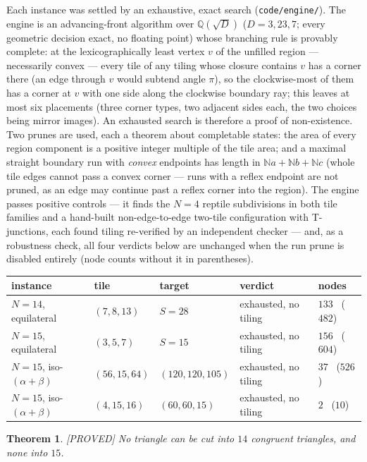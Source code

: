\documentclass[11pt,reqno]{amsart}
\theoremstyle{plain}
\newtheorem{theorem}{Theorem}
\theoremstyle{definition}
\newcommand{\Q}{\mathbb{Q}}
\newcommand{\N}{\mathbb{N}}
\newcommand{\lab}[1]{\hfill\textnormal{\footnotesize\textsc{[#1]}}}
\begin{document}
Each instance was settled by an exhaustive, exact search (\texttt{code/engine/}). The engine is an
advancing-front algorithm over $\Q(\sqrt D)$ ($D=3,23,7$; every geometric decision exact, no
floating point) whose branching rule is provably complete: at the lexicographically least vertex
$v$ of the unfilled region --- necessarily convex --- every tile of any tiling whose closure
contains $v$ has a corner there (an edge through $v$ would subtend angle $\pi$), so the
clockwise-most of them has a corner at $v$ with one side along the clockwise boundary ray; this
leaves at most six placements (three corner types, two adjacent sides each, the two choices being
mirror images). An exhausted search is therefore a proof of non-existence. Two prunes are used,
each a theorem about completable states: the area of every region component is a positive integer
multiple of the tile area; and a maximal straight boundary run with \emph{convex} endpoints has
length in $\N a+\N b+\N c$ (whole tile edges cannot pass a convex corner --- runs with a reflex
endpoint are not pruned, as an edge may continue past a reflex corner into the region). The engine
passes positive controls --- it finds the $N=4$ reptile subdivisions in both tile families and a
hand-built non-edge-to-edge two-tile configuration with T-junctions, each found tiling re-verified
by an independent checker --- and, as a robustness check, all four verdicts below are unchanged
when the run prune is disabled entirely (node counts without it in parentheses).
\begin{center}
\begin{tabular}{lllll}
instance & tile & target & verdict & nodes\\
\hline
$N=14$, equilateral & $(7,8,13)$ & $S=28$ & exhausted, no tiling & $133$ \ ($482$)\\
$N=15$, equilateral & $(3,5,7)$ & $S=15$ & exhausted, no tiling & $156$ \ ($604$)\\
$N=15$, iso-$(\alpha{+}\beta)$ & $(56,15,64)$ & $(120,120,105)$ & exhausted, no tiling & $37$ \ ($526$)\\
$N=15$, iso-$(\alpha{+}\beta)$ & $(4,15,16)$ & $(60,60,15)$ & exhausted, no tiling & $2$ \ ($10$)\\
\end{tabular}
\end{center}

\begin{theorem}\label{thm:frontier}\lab{PROVED}
No triangle can be cut into $14$ congruent triangles, and none into $15$.
\end{theorem}
\end{document}
